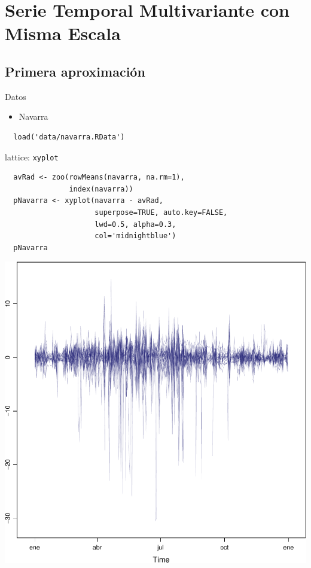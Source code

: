 \documentclass[xcolor={usenames,svgnames,dvipsnames}]{beamer}
\begin{document}
\section{Serie Temporal Multivariante con Misma Escala}
\label{sec-3}

\subsection{Primera aproximación}
\label{sec-3-1}
\begin{frame}[fragile,label=sec-3-1-1]{Datos}
 \begin{itemize}
\item Navarra
\end{itemize}
\lstset{language=R,label= ,caption= ,numbers=none}
\begin{lstlisting}
  load('data/navarra.RData')
\end{lstlisting}
\end{frame}


\begin{frame}[fragile,label=sec-3-1-2]{lattice: \texttt{xyplot}}
 \lstset{language=R,label= ,caption= ,numbers=none}
\begin{lstlisting}
  avRad <- zoo(rowMeans(navarra, na.rm=1),
               index(navarra))
  pNavarra <- xyplot(navarra - avRad,
                     superpose=TRUE, auto.key=FALSE,
                     lwd=0.5, alpha=0.3,
                     col='midnightblue') 
  pNavarra
\end{lstlisting}
\end{frame}

\begin{frame}[label=sec-3-1-3]{}
\includegraphics[width=.9\linewidth]{figs/navarra.pdf}
\end{frame}
\end{document}
